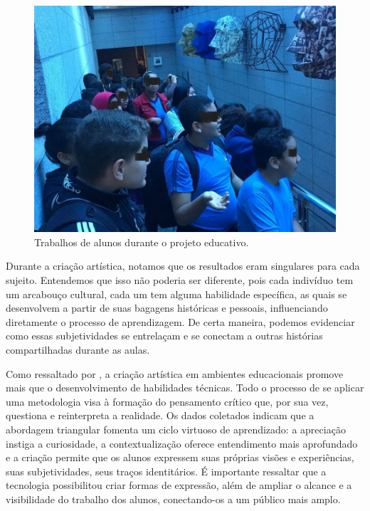 \documentclass[portuguese]{textolivre}
\begin{document}
\begin{figure}[h!]
    \centering
    \begin{minipage}{.55\textwidth}
    \includegraphics[width=\linewidth]{Imagem9.jpg}
    \caption{Trabalhos de alunos durante o projeto educativo.}
    \label{fig9}
    \end{minipage}
\end{figure}

Durante a criação artística, notamos que os resultados eram singulares para cada sujeito. Entendemos que isso não poderia ser diferente, pois cada indivíduo tem um arcabouço cultural, cada um tem alguma habilidade específica, as quais se desenvolvem a partir de suas bagagens históricas e pessoais, influenciando diretamente o processo de aprendizagem. De certa maneira, podemos evidenciar como essas subjetividades se entrelaçam e se conectam a outras histórias compartilhadas durante as aulas.

Como ressaltado por \textcite{minayo2010pesquisa}, a criação artística em ambientes educacionais promove mais que o desenvolvimento de habilidades técnicas. Todo o processo de se aplicar uma metodologia visa à formação do pensamento crítico que, por sua vez, questiona e reinterpreta a realidade. Os dados coletados indicam que a abordagem triangular fomenta um ciclo virtuoso de aprendizado: a apreciação instiga a curiosidade, a contextualização oferece entendimento mais aprofundado e a criação permite que os alunos expressem suas próprias visões e experiências, suas subjetividades, seus traços identitários. É importante ressaltar que a tecnologia possibilitou criar formas de expressão, além de ampliar o alcance e a visibilidade do trabalho dos alunos, conectando-os a um público mais amplo.
\end{document}
